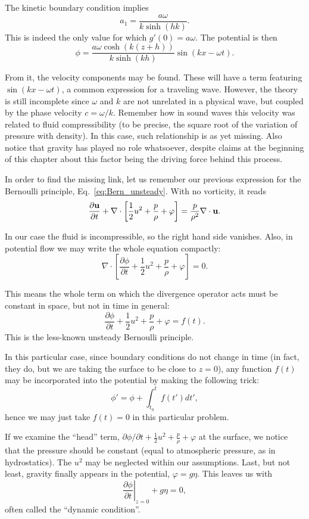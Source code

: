 The kinetic boundary condition implies
\[
a_1 = \frac{a \omega}{ k \sinh(hk)  } .
\]
This is indeed the only value for which $g'(0)= a \omega $. The
potential is then
\begin{equation}
  \label{eq:wave_potential}
  \phi = \frac{a \omega  \cosh(k(z+h)) }{ k \sinh( kh )  }  \sin(kx -\omega t ) .
\end{equation}

From it, the velocity components may be found. These will have a term
featuring $\sin(kx -\omega t )$, a common expression for a traveling
wave. However, the theory is still incomplete since $\omega$ and $k$
are not unrelated in a physical wave, but coupled by the phase
velocity $c=\omega / k$. Remember how in sound waves this velocity was
related to fluid compressibility (to be precise, the square root of
the variation of pressure with density). In this case, such
relationship is as yet missing. Also notice that gravity has played no
role whatsoever, despite claims at the beginning of this chapter about
this factor being the driving force behind this process.

In order to find the missing link, let us remember our previous
expression for the Bernoulli principle, Eq.~\ref{eq:Bern_unsteady}.
With no vorticity, it reads
\[
\frac{\partial \mathbf{u}}{\partial t} +
\nabla \cdot \left[
  \frac12 u^2 + \frac{p}{\rho} + \varphi
  \right] =  \frac{p}{\rho^2}\nabla \cdot \mathbf{u} .
\]

In our case the fluid is incompressible, so the right hand side
vanishes. Also, in potential flow we may write the whole equation
compactly:
\[
\nabla \cdot \left[
  \frac{\partial \phi}{\partial t} +
  \frac12 u^2 + \frac{p}{\rho} + \varphi
  \right] =  0 .
\]

This means the whole term on which the divergence operator acts
must be constant in space, but not in time in general:
\[
  \frac{\partial \phi}{\partial t} +
  \frac12 u^2 + \frac{p}{\rho} + \varphi =  f(t) .
\]
This is the less-known unsteady Bernoulli principle.

In this particular case, since boundary conditions do not change in
time (in fact, they do, but we are taking the surface to be close to
$z=0$), any function $f(t)$ may be incorporated into the potential
by making the following trick:
\[
\phi' = \phi + \int_{t_0}^t f(t') dt' ,
\]
hence we may just take $f(t)=0$ in this particular problem.

If we examine the ``head'' term, $ \partial \phi / \partial t +
\frac12 u^2 + \frac{p}{\rho} + \varphi$ at the surface, we notice that
the pressure should be constant (equal to atmospheric pressure, as in
hydrostatics). The $u^2$ may be neglected within our
assumptions. Last, but not least, gravity finally appears in the
potential, $\varphi = g \eta $. This leaves us with
\[
\left.\frac{\partial \phi}{\partial t}\right|_{z=0} + g \eta = 0 ,
\]
often called the ``dynamic condition''. 

